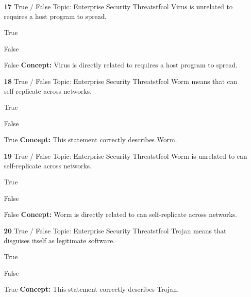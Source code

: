 \documentclass[10pt,a4paper]{article}
\begin{document}
\begin{qcard}{\color{white}\textbf{17} \hfill \small True / False \textbar{} Topic: Enterprise Security Threats}{tfcol}
Virus is unrelated to requires a host program to spread.

\begin{qoptions}
\item True
\item False
\end{qoptions}
\begin{explainbox}{False}
\textbf{Concept:} Virus is directly related to requires a host program to spread.
\end{explainbox}
\end{qcard}

\begin{qcard}{\color{white}\textbf{18} \hfill \small True / False \textbar{} Topic: Enterprise Security Threats}{tfcol}
Worm means that can self-replicate across networks.

\begin{qoptions}
\item True
\item False
\end{qoptions}
\begin{explainbox}{True}
\textbf{Concept:} This statement correctly describes Worm.
\end{explainbox}
\end{qcard}

\begin{qcard}{\color{white}\textbf{19} \hfill \small True / False \textbar{} Topic: Enterprise Security Threats}{tfcol}
Worm is unrelated to can self-replicate across networks.

\begin{qoptions}
\item True
\item False
\end{qoptions}
\begin{explainbox}{False}
\textbf{Concept:} Worm is directly related to can self-replicate across networks.
\end{explainbox}
\end{qcard}

\begin{qcard}{\color{white}\textbf{20} \hfill \small True / False \textbar{} Topic: Enterprise Security Threats}{tfcol}
Trojan means that disguises itself as legitimate software.

\begin{qoptions}
\item True
\item False
\end{qoptions}
\begin{explainbox}{True}
\textbf{Concept:} This statement correctly describes Trojan.
\end{explainbox}
\end{qcard}
\end{document}
